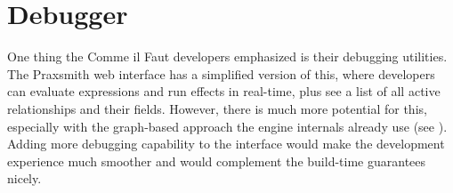 \section{Debugger} \label{sec:Debugger}

One thing the Comme il Faut developers emphasized is their debugging utilities. \cite{mccoy_comme_2011} The Praxsmith
web interface has a simplified version of this, where developers can evaluate expressions
and run effects in real-time, plus see a list of all active relationships and their
fields. However, there is much more potential for this, especially with the graph-based
approach the engine internals already use (see ). Adding more debugging capability
to the interface would make the development experience much smoother and would complement
the build-time guarantees nicely.
